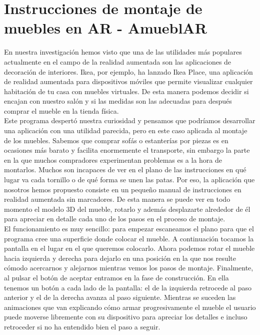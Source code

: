 \clearpage
\section{Instrucciones de montaje de muebles en AR - AmueblAR}

En nuestra investigación hemos visto que una de las utilidades más populares actualmente en el campo de la realidad aumentada son las aplicaciones de decoración de interiores. Ikea, por ejemplo, ha lanzado Ikea Place, una aplicación de realidad aumentada para dispositivos móviles que permite visualizar cualquier habitación de tu casa con muebles virtuales. De esta manera podemos decidir si encajan con nuestro salón y si las medidas son las adecuadas para después comprar el mueble en la tienda física.\\

Este programa despertó nuestra curiosidad y pensamos que podríamos desarrollar una aplicación con una utilidad parecida, pero en este caso aplicada al montaje de los muebles. Sabemos que comprar sofás o estanterías por piezas es en ocasiones más barato y facilita enormemente el transporte, sin embargo la parte en la que muchos compradores experimentan problemas es a la hora de montarlos. Muchos son incapaces de ver en el plano de las instrucciones en qué lugar va cada tornillo o de qué forma se unen las patas. Por eso, la aplicación que nosotros hemos propuesto consiste en un pequeño manual de instrucciones en realidad aumentada sin marcadores. De esta manera se puede ver en todo momento el modelo 3D del mueble, rotarlo y además desplazarte alrededor de él para apreciar en detalle cada uno de los pasos en el proceso de montaje.\\

El funcionamiento es muy sencillo: para empezar escaneamos el plano para que el programa cree una superficie donde colocar el mueble. A continuación tocamos la pantalla en el lugar en el que queremos colocarlo. Ahora podemos rotar el mueble hacia izquierda y derecha para dejarlo en una posición en la que nos resulte cómodo acercarnos y alejarnos mientras vemos los pasos de montaje. Finalmente, al pulsar el botón de aceptar entramos en la fase de construcción. En ella tenemos un botón a cada lado de la pantalla: el de la izquierda retrocede al paso anterior y el de la derecha avanza al paso siguiente. Mientras se suceden las animaciones que van explicando cómo armar progresivamente el mueble el usuario puede moverse libremente con su dispositivo para apreciar los detalles e incluso retroceder si no ha entendido bien el paso a seguir.\\

